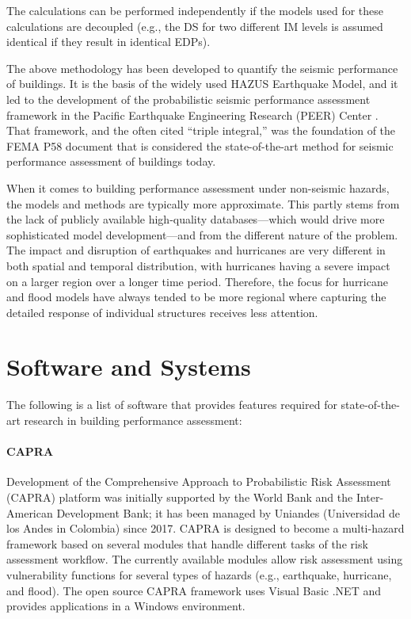 The calculations can be performed independently if the models used for these calculations are decoupled (e.g., the DS for two different IM levels is assumed identical if they result in identical EDPs).

The above methodology has been developed to quantify the seismic performance of buildings. It is the basis of the widely used HAZUS Earthquake Model, and it led to the development of the probabilistic seismic performance assessment framework in the Pacific Earthquake Engineering Research (PEER) Center \citep{porter2001assemblybased}. That framework, and the often cited “triple integral,” was the foundation of the FEMA P58 document that is considered the state-of-the-art method for seismic performance assessment of buildings today.

When it comes to building performance assessment under non-seismic hazards, the models and methods are typically more approximate. This partly stems from the lack of publicly available high-quality databases—which would drive more sophisticated model development—and from the different nature of the problem. The impact and disruption of earthquakes and hurricanes are very different in both spatial and temporal distribution, with hurricanes having a severe impact on a larger region over a longer time period. Therefore, the focus for hurricane and flood models have always tended to be more regional where capturing the detailed response of individual structures receives less attention.

\section{Software and Systems}
\label{sec:perf_bldg_tools}

The following is a list of software that provides features required for state-of-the-art research in building performance assessment:

\paragraph{CAPRA} Development of the Comprehensive Approach to Probabilistic Risk Assessment (CAPRA) platform was initially supported by the World Bank and the Inter-American Development Bank; it has been managed by Uniandes (Universidad de los Andes in Colombia) since 2017. CAPRA is designed to become a multi-hazard framework based on several modules that handle different tasks of the risk assessment workflow. The currently available modules allow risk assessment using vulnerability functions for several types of hazards (e.g., earthquake, hurricane, and flood). The open source CAPRA framework uses Visual Basic .NET and provides applications in a Windows environment.

